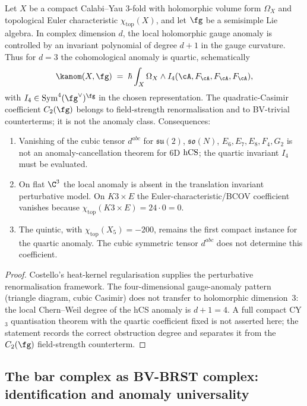 \begin{theorem}
\label{thm:plat-anomaly}
Let $X$ be a compact Calabi--Yau $3$-fold with holomorphic volume form
$\Omega_X$ and topological Euler characteristic $\chi_{\mathrm{top}}(X)$,
and let $\fg$ be a semisimple Lie algebra. In complex dimension $d$, the
local holomorphic gauge anomaly is controlled by an invariant polynomial
of degree $d+1$ in the gauge curvature. Thus for $d=3$ the cohomological
anomaly is quartic, schematically
\[
 \kanom(X,\fg)
 \;=\;
 \hbar \int_X \Omega_X \wedge
 I_4(\cA,F_\cA,F_\cA,F_\cA),
\]
with $I_4 \in \mathrm{Sym}^4(\fg^\vee)^{\fg}$ in the chosen
representation. The quadratic-Casimir coefficient $C_2(\fg)$ belongs to
field-strength renormalisation and to BV-trivial counterterms; it is not
the anomaly class.
Consequences:
\begin{enumerate}[label=\textup{(\roman*)}]
\item Vanishing of the cubic tensor $d^{abc}$ for
$\mathfrak{su}(2)$, $\mathfrak{so}(N)$, $E_6,E_7,E_8,F_4,G_2$ is not an
anomaly-cancellation theorem for $6$D $\mathrm{hCS}$; the quartic invariant
$I_4$ must be evaluated.
\item On flat $\C^3$ the local anomaly is absent in the translation
invariant perturbative model. On $K3\times E$ the
Euler-characteristic/BCOV coefficient vanishes because
$\chi_{\mathrm{top}}(K3\times E)=24\cdot0=0$.
\item The quintic, with $\chi_{\mathrm{top}}(X_5)=-200$, remains the
first compact instance for the quartic anomaly. The cubic symmetric
tensor $d^{abc}$ does not determine this coefficient.
\end{enumerate}
\end{theorem}

\begin{proof}
Costello's heat-kernel regularisation supplies the perturbative
renormalisation framework. The four-dimensional gauge-anomaly pattern
(triangle diagram, cubic Casimir) does not transfer to holomorphic
dimension~$3$: the local Chern--Weil degree of the hCS anomaly is
$d+1=4$. A full compact CY$_3$ quantisation theorem with the quartic
coefficient fixed is not asserted here; the statement records the
correct obstruction degree and separates it from the $C_2(\fg)$
field-strength counterterm.
\end{proof}

\subsection{The bar complex as BV-BRST complex: identification and anomaly universality}
\label{subsec:phys-bv-bar-identification}

